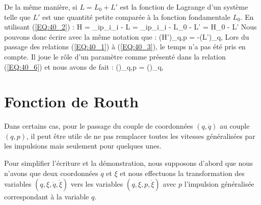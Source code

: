 De la m\^{e}me mani\`{e}re, si $L = L_{0} + L'$ est la fonction de Lagrange d'un syst\`{e}me telle que $L'$ est une quantit\'{e} petite compar\'{e}e \`{a} la fonction fondamentale $L_{0}$. En utilisant (\ref{EQ:40_2}) :
\benn
	H = \sum_{i}p_{i}_{i} - L = \sum_{i}p_{i}_{i} - L_{0} - L' = H_{0} - L'
\eenn
Nous pouvons donc \'{e}crire avec la m\^{e}me notation que :
\be
	\left(H'\right)_{q,p} = -\left(L'\right)_{q,} \label{EQ:40_7}
\ee
Lors du passage des relations (\ref{EQ:40_1}) \`{a} (\ref{EQ:40_3}), le temps n'a pas \'{e}t\'{e} pris en compte. Il joue le r\^{o}le d'un param\`{e}tre comme pr\'{e}sent\'{e} dans la relation (\ref{EQ:40_6}) et nous avons de fait :
\be
	\left(\right)_{q,p} = \left(\right)_{q,} \label{EQ:40_8}
\ee

\section{Fonction de Routh}\label{PAR:41}

Dans certains cas, pour le passage du couple de coordonn\'{e}es $(q,\dot{q})$ au couple $(q,p)$, il peut \^{e}tre utile de ne pas remplacer toutes les vitesses g\'{e}n\'{e}ralis\'{e}es par les impulsions mais seulement pour quelques unes.

Pour simplifier l'\'{e}criture et la d\'{e}monstration, nous supposons d'abord que nous n'avons que deux coordonn\'{e}es $q$ et $\xi$ et nous effectuons la transformation des variables $(q,\xi,\dot{q},\dot{\xi})$ vers les variables $(q,\xi,p,\dot{\xi})$ avec $p$ l'impulsion g\'{e}n\'{e}ralis\'{e}e correspondant \`{a} la variable $q$.

